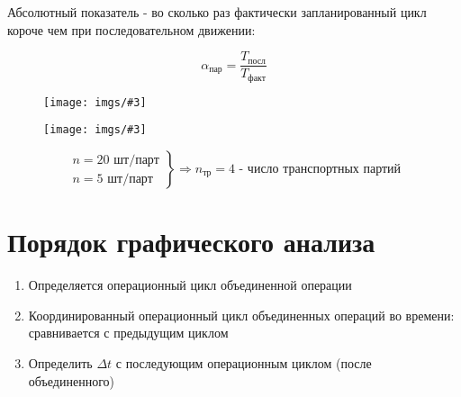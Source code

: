 \documentclass[14pt,a4paper,oneside]{extarticle}
\newcommand{\pic}[3]{
	\begin{figure}[#1]
		\begin{center}
			\texttt{[image: imgs/\#3]}
		\end{center}
	\end{figure}
}
\begin{document}
Абсолютный показатель -  во сколько раз фактически запланированный цикл короче чем при последовательном движении:

\[\alpha_\text{пар}=\frac{T_\text{посл}}{T_\text{факт}}\]

\pic{H}{\textwidth/2}{15}

\pic{H}{\textwidth}{16}

$$
 \left.
    \begin{array}{ll}
        n=20\text{ шт/парт} \\
        n=5\text{ шт/парт}
    \end{array}
\right \}\Longrightarrow n_\text{тр}=4\text{ - число транспортных партий}
$$

\section{Порядок графического анализа}

\begin{enumerate}
    \item Определяется операционный цикл объединенной операции
    \item Координированный операционный цикл объединенных операций во времени: сравнивается с предыдущим циклом 
    \item Определить $\Delta t$ с последующим операционным циклом (после объединенного)
\end{enumerate}
\end{document}
